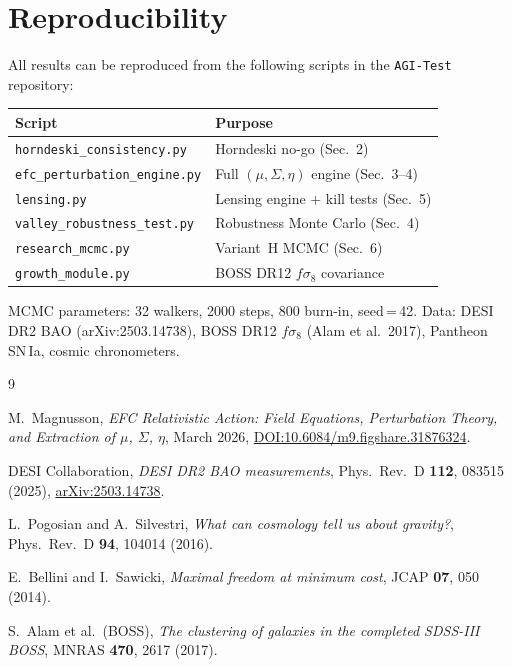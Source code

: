 \documentclass[11pt,a4paper]{article}
\begin{document}
\newpage
\section{Reproducibility}

All results can be reproduced from the following scripts in the
\texttt{AGI-Test} repository:

\begin{center}
\begin{tabular}{@{}lp{9cm}@{}}
\toprule
Script & Purpose \\
\midrule
\texttt{horndeski\_consistency.py} & Horndeski no-go (Sec.~2) \\
\texttt{efc\_perturbation\_engine.py} & Full $(\mu,\Sigma,\eta)$ engine (Sec.~3--4) \\
\texttt{lensing.py} & Lensing engine + kill tests (Sec.~5) \\
\texttt{valley\_robustness\_test.py} & Robustness Monte Carlo (Sec.~4) \\
\texttt{research\_mcmc.py} & Variant~H MCMC (Sec.~6) \\
\texttt{growth\_module.py} & BOSS DR12 $f\sigma_8$ covariance \\
\bottomrule
\end{tabular}
\end{center}

MCMC parameters: 32 walkers, 2000 steps, 800 burn-in, seed\,=\,42.
Data: DESI DR2 BAO (arXiv:2503.14738), BOSS DR12 $f\sigma_8$
(Alam et al.\ 2017), Pantheon SN\,Ia, cosmic chronometers.

\begin{thebibliography}{9}

M.~Magnusson,
\emph{EFC Relativistic Action: Field Equations, Perturbation Theory,
and Extraction of $\mu$, $\Sigma$, $\eta$},
March 2026,
\href{https://doi.org/10.6084/m9.figshare.31876324}{DOI:10.6084/m9.figshare.31876324}.

DESI Collaboration,
\emph{DESI DR2 BAO measurements},
Phys.\ Rev.\ D \textbf{112}, 083515 (2025),
\href{https://arxiv.org/abs/2503.14738}{arXiv:2503.14738}.

L.~Pogosian and A.~Silvestri,
\emph{What can cosmology tell us about gravity?},
Phys.\ Rev.\ D \textbf{94}, 104014 (2016).

E.~Bellini and I.~Sawicki,
\emph{Maximal freedom at minimum cost},
JCAP \textbf{07}, 050 (2014).

S.~Alam et al.\ (BOSS),
\emph{The clustering of galaxies in the completed SDSS-III BOSS},
MNRAS \textbf{470}, 2617 (2017).

\end{thebibliography}
\end{document}
